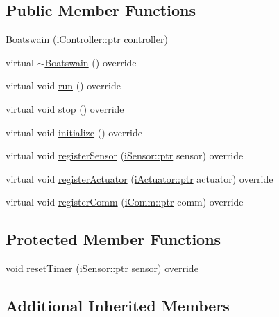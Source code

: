 \subsection*{Public Member Functions}
\begin{DoxyCompactItemize}
\item 
\hyperlink{classo_cpt_1_1_boatswain_a43e10039b53b8bde7ad2e9780db68949}{Boatswain} (\hyperlink{classo_cpt_1_1i_controller_a6d89a95cd6ad68bb74adfaca2f36370f}{i\+Controller\+::ptr} controller)
\item 
virtual \hyperlink{classo_cpt_1_1_boatswain_a0cff16b78dc5ee0e6b5d2169d693036f}{$\sim$\+Boatswain} () override
\item 
virtual void \hyperlink{classo_cpt_1_1_boatswain_a7665a4439b8e71ece31ff5e9755caf09}{run} () override
\item 
virtual void \hyperlink{classo_cpt_1_1_boatswain_ad538cca1d6429dacf09b22c53291074f}{stop} () override
\item 
virtual void \hyperlink{classo_cpt_1_1_boatswain_aa1c27c710e2156402c3851ac189ea162}{initialize} () override
\item 
virtual void \hyperlink{classo_cpt_1_1_boatswain_ab36071db5e3f8a0db0053b5553e508f0}{register\+Sensor} (\hyperlink{classo_cpt_1_1i_sensor_a03533d2c5dc66e332d70dbb3b5e3006a}{i\+Sensor\+::ptr} sensor) override
\item 
virtual void \hyperlink{classo_cpt_1_1_boatswain_ae3f318352a331d64840ff87ad1ce3e8e}{register\+Actuator} (\hyperlink{classo_cpt_1_1i_actuator_a35847799558e92bb84fb6c71de772cac}{i\+Actuator\+::ptr} actuator) override
\item 
virtual void \hyperlink{classo_cpt_1_1_boatswain_a7abff24ce1f199690a4890793ff8c23c}{register\+Comm} (\hyperlink{classo_cpt_1_1i_comm_af0c655f143251b7d03fcd98f89637228}{i\+Comm\+::ptr} comm) override
\end{DoxyCompactItemize}
\subsection*{Protected Member Functions}
\begin{DoxyCompactItemize}
\item 
void \hyperlink{classo_cpt_1_1_boatswain_aca864b4219485c6d83ad0e92c7ea16fd}{reset\+Timer} (\hyperlink{classo_cpt_1_1i_sensor_a03533d2c5dc66e332d70dbb3b5e3006a}{i\+Sensor\+::ptr} sensor) override
\end{DoxyCompactItemize}
\subsection*{Additional Inherited Members}


